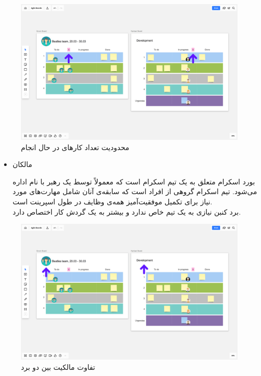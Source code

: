 {\begin{figure}
	\centering
	\includegraphics[scale=0.3]{figs/4-2-a}
	\caption{محدودیت تعداد کار‌های در حال انجام}
\end{figure}

\begin{itemize}
\item مالکان

بورد اسکرام متعلق به یک تیم اسکرام است که معمولاً توسط یک رهبر با نام  اداره می‌شود. تیم اسکرام گروهی از افراد است که سابقه‌ی آنان شامل مهارت‌های مورد نیاز برای تکمیل موفقیت‌آمیز همه‌ی وظایف در طول اسپرینت است.
\\
برد کنبن نیازی به یک تیم خاص ندارد و بیشتر به یک گردش کار اختصاص دارد.

\end{itemize}

\begin{figure}
	\centering
	\includegraphics[scale=0.3]{figs/4-2-b}
	\caption{تفاوت مالکیت بین دو برد}
\end{figure}


}
